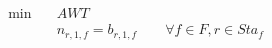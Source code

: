 \begin{align}
  \min\quad & \mathit{AWT} \tag{eq\_0039} \\
  & n_{r,1,f} = b_{r,1,f} \qquad \forall f \in F, r \in Sta_{f} \tag{eq\_0013} \\
\end{align}
